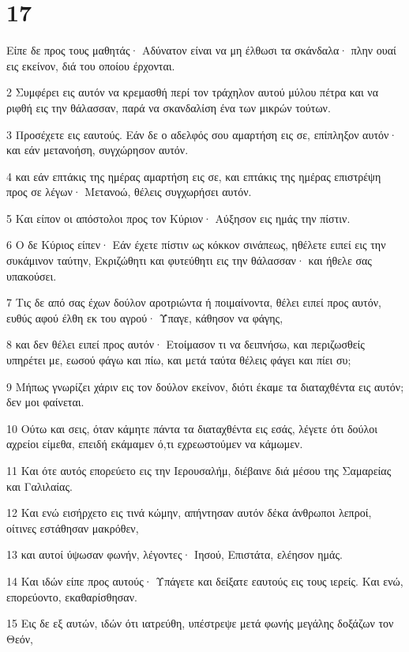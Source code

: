 \chapter{17}

\par Είπε δε προς τους μαθητάς· Αδύνατον είναι να μη έλθωσι τα σκάνδαλα· πλην ουαί εις εκείνον, διά του οποίου έρχονται.
\par 2 Συμφέρει εις αυτόν να κρεμασθή περί τον τράχηλον αυτού μύλου πέτρα και να ριφθή εις την θάλασσαν, παρά να σκανδαλίση ένα των μικρών τούτων.
\par 3 Προσέχετε εις εαυτούς. Εάν δε ο αδελφός σου αμαρτήση εις σε, επίπληξον αυτόν· και εάν μετανοήση, συγχώρησον αυτόν.
\par 4 και εάν επτάκις της ημέρας αμαρτήση εις σε, και επτάκις της ημέρας επιστρέψη προς σε λέγων· Μετανοώ, θέλεις συγχωρήσει αυτόν.
\par 5 Και είπον οι απόστολοι προς τον Κύριον· Αύξησον εις ημάς την πίστιν.
\par 6 Ο δε Κύριος είπεν· Εάν έχετε πίστιν ως κόκκον σινάπεως, ηθέλετε ειπεί εις την συκάμινον ταύτην, Εκριζώθητι και φυτεύθητι εις την θάλασσαν· και ήθελε σας υπακούσει.
\par 7 Τις δε από σας έχων δούλον αροτριώντα ή ποιμαίνοντα, θέλει ειπεί προς αυτόν, ευθύς αφού έλθη εκ του αγρού· Ύπαγε, κάθησον να φάγης,
\par 8 και δεν θέλει ειπεί προς αυτόν· Ετοίμασον τι να δειπνήσω, και περιζωσθείς υπηρέτει με, εωσού φάγω και πίω, και μετά ταύτα θέλεις φάγει και πίει συ;
\par 9 Μήπως γνωρίζει χάριν εις τον δούλον εκείνον, διότι έκαμε τα διαταχθέντα εις αυτόν; δεν μοι φαίνεται.
\par 10 Ούτω και σεις, όταν κάμητε πάντα τα διαταχθέντα εις εσάς, λέγετε ότι δούλοι αχρείοι είμεθα, επειδή εκάμαμεν ό,τι εχρεωστούμεν να κάμωμεν.
\par 11 Και ότε αυτός επορεύετο εις την Ιερουσαλήμ, διέβαινε διά μέσου της Σαμαρείας και Γαλιλαίας.
\par 12 Και ενώ εισήρχετο εις τινά κώμην, απήντησαν αυτόν δέκα άνθρωποι λεπροί, οίτινες εστάθησαν μακρόθεν,
\par 13 και αυτοί ύψωσαν φωνήν, λέγοντες· Ιησού, Επιστάτα, ελέησον ημάς.
\par 14 Και ιδών είπε προς αυτούς· Υπάγετε και δείξατε εαυτούς εις τους ιερείς. Και ενώ, επορεύοντο, εκαθαρίσθησαν.
\par 15 Εις δε εξ αυτών, ιδών ότι ιατρεύθη, υπέστρεψε μετά φωνής μεγάλης δοξάζων τον Θεόν,
